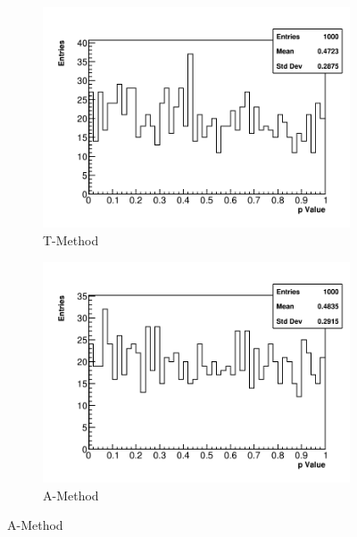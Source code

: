 \begin{figure}[]
\centering
    \begin{subfigure}[t]{0.45\textwidth}
        \centering
        \includegraphics[width=\textwidth]{PValues_TMethod}
        \caption{T-Method}
    \end{subfigure}
    \hspace{1mm}
    \begin{subfigure}[t]{0.45\textwidth}
        \centering
        \includegraphics[width=\textwidth]{PValues_AMethod}
        \caption{A-Method}
    \end{subfigure}%


\end{figure}
